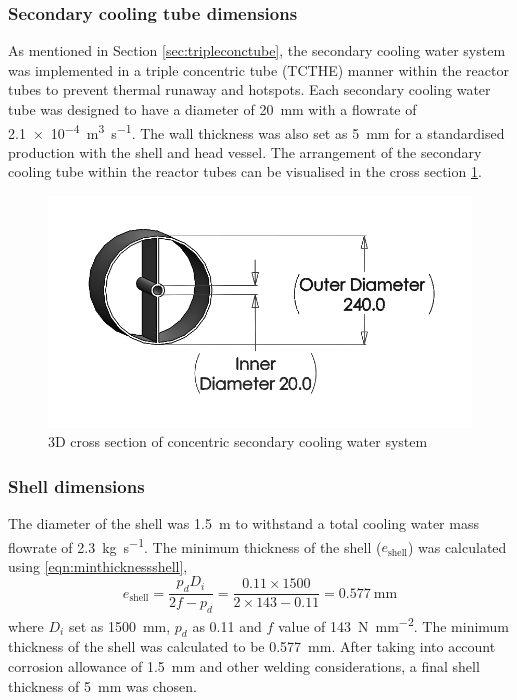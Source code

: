 \subsubsection{Secondary cooling tube dimensions}
As mentioned in Section \ref{sec:tripleconctube}, the secondary cooling water system was implemented in a triple concentric tube (TCTHE) manner within the reactor tubes to prevent thermal runaway and hotspots. Each secondary cooling water tube was designed to have a diameter of \SI{20}{\milli \metre} with a flowrate of \SI{2.1e-4}{\cubic\m\per\s}. The wall thickness was also set as \SI{5}{\milli \metre} for a standardised production with the shell and head vessel. 
The arrangement of the secondary cooling tube within the reactor tubes can be visualised in the cross section \cref{fig:concentriccoolingwater}. 
\begin{figure}[H]
    \centering
    \includegraphics[width=0.65\linewidth]{chapters/2-reaction/figures/FYD conc tube with calc bw.png} 
    \caption{3D cross section of concentric secondary cooling water system}
    \label{fig:concentriccoolingwater}
\end{figure}

\subsubsection{Shell dimensions}
The diameter of the shell was \SI{1.5}{\metre} to withstand a total cooling water mass flowrate of \SI{2.3}{\kilogram \per \second}.
The minimum thickness of the shell ($e_\mathrm{shell}$) was calculated using \cref{eqn:minthicknessshell},
\begin{equation}
    e_\mathrm{shell} = \frac{p_dD_i}{2f-p_d} = \frac{0.11 \times 1500}{2 \times 143 - 0.11} = \SI{0.577}{\mm}
    \label{eqn:minthicknessshell}
\end{equation}
where $D_i$ set as \SI{1500}{\milli \metre}, $p_d$ as 0.11 and $f$ value of \SI{143}{\N\per\square\mm}. The minimum thickness of the shell was calculated to be \SI{0.577}{\milli \metre}. After taking into account corrosion allowance of \SI{1.5}{\milli \metre} and other welding considerations, a final shell thickness of \SI{5}{\milli \metre} was chosen. 

